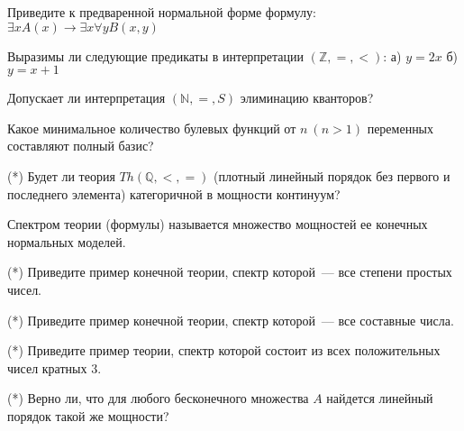 \setcounter{curtask}{1}


\begin{task}
    Приведите к предваренной нормальной форме формулу:
    $\exists x A(x) \rightarrow \exists x \forall y B(x, y)$
\end{task}

\begin{task}
    Выразимы ли следующие предикаты в интерпретации
    $(\mathbb{Z}, =, <)$:
    а) $y = 2x$
    б) $y = x + 1$
\end{task}

\begin{task}
    Допускает ли интерпретация $(\mathbb{N}, =, S)$ элиминацию
    кванторов?
\end{task}

\begin{task}
    Какое минимальное количество булевых функций от $n~ (n > 1)$
    переменных составляют полный базис?
\end{task}


\breakline

\begin{task}(*)
    Будет ли теория $Th(\mathbb{Q}, <, =)$ (плотный линейный порядок
    без первого и последнего элемента) категоричной в мощности континуум?
\end{task}

Спектром теории (формулы) называется множество мощностей ее конечных нормальных
моделей.

\begin{task}(*)
    Приведите пример конечной теории, спектр которой~--- все степени
    простых чисел.
\end{task}

\begin{task}(*)
    Приведите пример конечной теории, спектр которой~--- все составные
    числа.
\end{task}

\begin{task}(*)
    Приведите пример теории, спектр которой состоит из всех
    положительных чисел кратных $3$.
\end{task}

\begin{task}(*)
    Верно ли, что для любого бесконечного множества $A$ найдется
    линейный порядок такой же мощности?
\end{task}